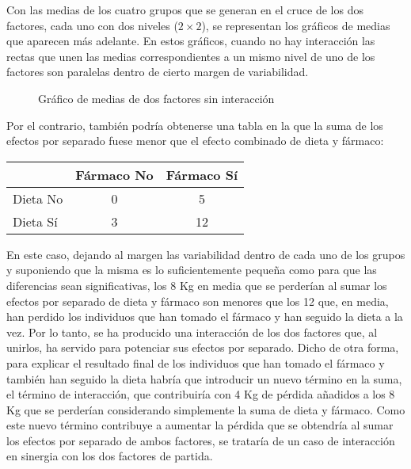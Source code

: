 Con las medias de los cuatro grupos que se generan en el cruce de los dos factores, cada uno con dos niveles
($2\times2$), se representan los gráficos de medias que aparecen más adelante. En estos gráficos, cuando no hay
interacción las rectas que unen las medias correspondientes a un mismo nivel de uno de los factores son paralelas dentro
de cierto margen de variabilidad.

\begin{figure}[h!]
\begin{center}
\scalebox{0.8}{}
\caption{Gráfico de medias de dos factores sin interacción}
\end{center}
\end{figure}

Por el contrario, también podría obtenerse una tabla en la que la suma de los efectos por separado fuese menor que el efecto combinado de dieta y fármaco:

\begin{center}
\begin{tabular}{|l|c|c|}
\cline{2-3}
\multicolumn{1}{c|}{} & Fármaco No & Fármaco Sí \\
\hline
Dieta No & 0 & 5 \\
\hline
Dieta Sí & 3 & 12 \\
\hline
\end{tabular}
\end{center}

En este caso, dejando al margen las variabilidad dentro de cada uno de los grupos y suponiendo que la misma es lo
suficientemente pequeña como para que las diferencias sean significativas, los 8 Kg en media que se perderían al sumar
los efectos por separado de dieta y fármaco son menores que los 12 que, en media, han perdido los individuos que han
tomado el fármaco y han seguido la dieta a la vez. Por lo tanto, se ha producido una interacción de los dos factores
que, al unirlos, ha servido para potenciar sus efectos por separado. Dicho de otra forma, para explicar el resultado
final de los individuos que han tomado el fármaco y también han seguido la dieta habría que introducir un nuevo término
en la suma, el término de interacción, que contribuiría con 4 Kg de pérdida añadidos a los 8 Kg que se perderían
considerando simplemente la suma de dieta y fármaco. Como este nuevo término contribuye a aumentar la pérdida que se
obtendría al sumar los efectos por separado de ambos factores, se trataría de un caso de interacción en sinergia con los
dos factores de partida.

